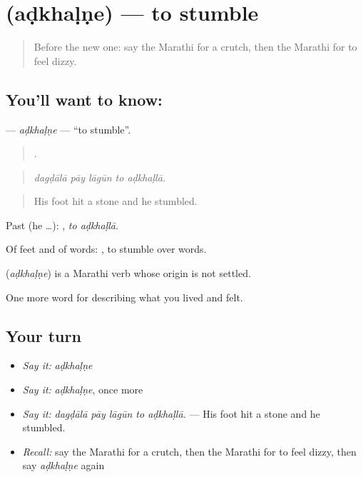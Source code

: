 \section[\texorpdfstring{\mr{अडखळणे} (aḍkhaḷṇe)}{अडखळणे (aḍkhaḷṇe)}]{ (aḍkhaḷṇe) — to stumble}

\label{lesson:MR-C493-adkhalne}



\begin{quote}
Before the new one: say the Marathi for a crutch, then the Marathi for to feel dizzy.
\end{quote}

\subsection*{You'll want to know: }
\textbf{} — \emph{aḍkhaḷṇe} — \textquotedblleft{}to stumble\textquotedblright{}.

\begin{quote}
    .
\end{quote}

\begin{quote}
\emph{dagḍālā pāy lāgūn to aḍkhaḷlā.}
\end{quote}

\begin{quote}
His foot hit a stone and he stumbled.
\end{quote}

Past (he …):  , \emph{to aḍkhaḷlā}.

Of feet and of words:  , to stumble over words.

\begin{cousinweb}
\textbf{} (\emph{aḍkhaḷṇe}) is a Marathi verb whose origin is not settled.
\end{cousinweb}

\begin{grammarlens}[title={What you've built}]
One more word for describing what you lived and felt.
\end{grammarlens}

\subsection*{Your turn}
\begin{itemize}
\raggedright
  \item \emph{Say it:} \emph{aḍkhaḷṇe}
  \item \emph{Say it:} \emph{aḍkhaḷṇe}, once more
  \item \emph{Say it:} \emph{dagḍālā pāy lāgūn to aḍkhaḷlā.} — His foot hit a stone and he stumbled.
  \item \emph{Recall:} say the Marathi for a crutch, then the Marathi for to feel dizzy, then say \emph{aḍkhaḷṇe} again
\end{itemize}

